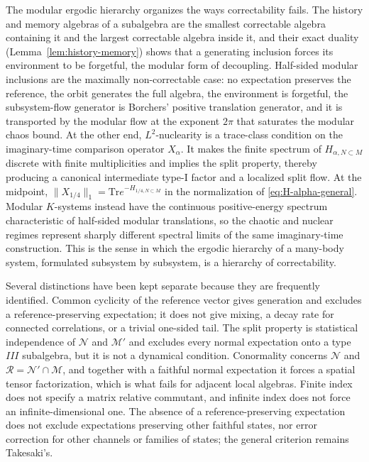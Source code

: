 \documentclass[a4paper,11pt]{article}
\theoremstyle{definition}
\newcommand{\Tr}{\text{Tr}}
\begin{document}
The modular ergodic hierarchy organizes the ways correctability fails. The history and memory algebras of a subalgebra are the smallest correctable algebra containing it and the largest correctable algebra inside it, and their exact duality (Lemma~\ref{lem:history-memory}) shows that a generating inclusion forces its environment to be forgetful, the modular form of decoupling. Half-sided modular inclusions are the maximally non-correctable case: no expectation preserves the reference, the orbit generates the full algebra, the environment is forgetful, the subsystem-flow generator is Borchers' positive translation generator, and it is transported by the modular flow at the exponent $2\pi$ that saturates the modular chaos bound. At the other end, $L^2$-nuclearity is a trace-class condition on the imaginary-time comparison operator $X_\alpha$. It makes the finite spectrum of $H_{\alpha,N\subset M}$ discrete with finite multiplicities and implies the split property, thereby producing a canonical intermediate type-I factor and a localized split flow. At the midpoint, $\|X_{1/4}\|_1=\Tr e^{-H_{1/4,N\subset M}}$ in the normalization of \eqref{eq:H-alpha-general}. Modular $K$-systems instead have the continuous positive-energy spectrum characteristic of half-sided modular translations, so the chaotic and nuclear regimes represent sharply different spectral limits of the same imaginary-time construction. This is the sense in which the ergodic hierarchy of a many-body system, formulated subsystem by subsystem, is a hierarchy of correctability.

Several distinctions have been kept separate because they are frequently identified. Common cyclicity of the reference vector gives generation and excludes a reference-preserving expectation; it does not give mixing, a decay rate for connected correlations, or a trivial one-sided tail. The split property is statistical independence of $\mathcal N$ and $\mathcal M'$ and excludes every normal expectation onto a type $III$ subalgebra, but it is not a dynamical condition. Conormality concerns $\mathcal N$ and $\mathcal R=\mathcal N'\cap\mathcal M$, and together with a faithful normal expectation it forces a spatial tensor factorization, which is what fails for adjacent local algebras. Finite index does not specify a matrix relative commutant, and infinite index does not force an infinite-dimensional one. The absence of a reference-preserving expectation does not exclude expectations preserving other faithful states, nor error correction for other channels or families of states; the general criterion remains Takesaki's.
\end{document}
